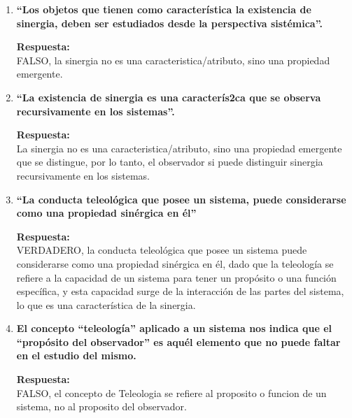\documentclass[12pt,a4paper]{article}
\begin{document}
\begin{enumerate}[label=\textbf{Pregunta \arabic*.}]
          \textbf{Respuesta:} \\
          FALSO, algo no puede SER un sistema, dado que los sistemas son conceptualizaciones del observador.
          Aunque un pensador reduccionista si podria estudiar un sistema a traves de la division del "todo" en partes, pero no podria comprender las propiedades emergentes del sistema, dado que estas surgen de la interacción de las partes y no pueden ser entendidas simplemente analizando cada parte por separado.

    \item \textbf{“Los objetos que tienen como característica
              la existencia de sinergia, deben ser estudiados
              desde la perspectiva sistémica”.}

          \textbf{Respuesta:} \\
          FALSO, la sinergia no es una caracteristica/atributo, sino una propiedad emergente.

    \item \textbf{“La existencia de sinergia es una caracterís2ca que se observa
              recursivamente en los sistemas”.}

          \textbf{Respuesta:} \\
          La sinergia no es una caracteristica/atributo, sino una propiedad emergente que se distingue, por lo tanto, el observador si puede
          distinguir sinergia recursivamente en los sistemas.

    \item \textbf{“La conducta teleológica que posee un sistema, puede considerarse
              como una propiedad sinérgica en él”}

          \textbf{Respuesta:} \\
          VERDADERO, la conducta teleológica que posee un sistema puede considerarse como una propiedad sinérgica en él, dado que la teleología se refiere a la capacidad de un sistema para tener un propósito o una función específica, y esta capacidad surge de la interacción de las partes del sistema, lo que es una característica de la sinergia.

    \item \textbf{El concepto “teleología” aplicado a un sistema nos indica que el
              “propósito del observador” es aquél elemento que no puede faltar en el
              estudio del mismo.}

          \textbf{Respuesta:} \\
          FALSO, el concepto de Teleologia se refiere al proposito o funcion de un sistema, no al proposito del observador.


\end{enumerate}
\end{document}
